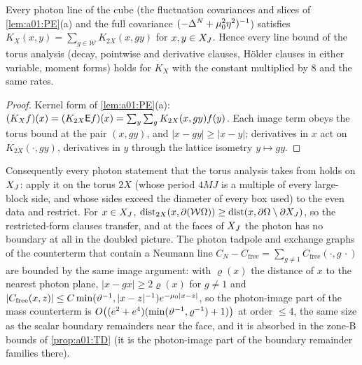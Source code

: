 \begin{lemma}\label{lem:a01:NL}
Every photon line of the cube (the fluctuation covariances and slices of \cref{lem:a01:PE}(a) and the full covariance $(-\Delta^N+\mu_0^2\eta^2)^{-1}$) satisfies $K_X(x,y)=\sum_{g\in\mathcal W}K_{2X}(x,gy)$ for $x,y\in X_J$. Hence every line bound of the torus analysis (decay, pointwise and derivative clauses, H\"older clauses in either variable, moment forms) holds for $K_X$ with the constant multiplied by $8$ and the same rates.
\end{lemma}
\begin{proof}
Kernel form of \cref{lem:a01:PE}(a): $(K_Xf)(x)=(K_{2X}\mathsf E f)(x)=\sum_y\sum_gK_{2X}(x,gy)f(y)$. Each image term obeys the torus bound at the pair $(x,gy)$, and $|x-gy|\ge|x-y|$; derivatives in $x$ act on $K_{2X}(\cdot,gy)$, derivatives in $y$ through the lattice isometry $y\mapsto gy$.
\end{proof}

Consequently every photon statement that the torus analysis takes from \cite{Ba1,Ba2,Ba3} holds on $X_J$: apply it on the torus $2X$ (whose period $4MJ$ is a multiple of every large-block side, and whose sides exceed the diameter of every box used) to the even data and restrict. For $x\in X_J$, $\operatorname{dist}_{2X}(x,\partial(\mathcal W\Omega))\ge\operatorname{dist}(x,\partial\Omega\setminus\partial X_J)$, so the restricted-form clauses transfer, and at the faces of $X_J$ the photon has no boundary at all in the doubled picture. The photon tadpole and exchange graphs of the counterterm that contain a Neumann line $C_N-C_{\mathrm{free}}=\sum_{g\ne1}C_{\mathrm{free}}(\cdot,g\,\cdot)$ are bounded by the same image argument: with $\varrho(x)$ the distance of $x$ to the nearest photon plane, $|x-gx|\ge2\varrho(x)$ for $g\ne1$ and $|C_{\mathrm{free}}(x,z)|\le C\min(\vartheta^{-1},|x-z|^{-1})e^{-\mu_0|x-z|}$, so the photon-image part of the mass counterterm is $O\big((e^2+e^4)(\min(\vartheta^{-1},\varrho^{-1})+1)\big)$ at order $\le4$, the same size as the scalar boundary remainders near the face, and it is absorbed in the zone-B bounds of \cref{prop:a01:TD} (it is the photon-image part of the boundary remainder families there).
